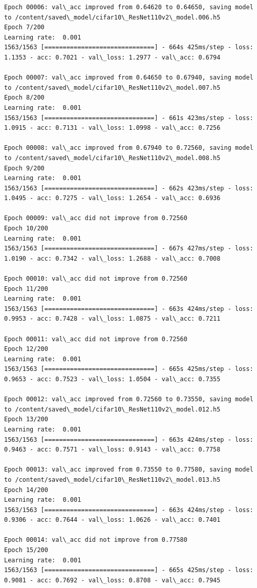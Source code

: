 \documentclass[11pt]{article}
\begin{document}
\begin{Verbatim}[commandchars=\\\{\}]
Epoch 00006: val\_acc improved from 0.64620 to 0.64650, saving model to /content/saved\_model/cifar10\_ResNet110v2\_model.006.h5
Epoch 7/200
Learning rate:  0.001
1563/1563 [==============================] - 664s 425ms/step - loss: 1.1353 - acc: 0.7021 - val\_loss: 1.2977 - val\_acc: 0.6794

Epoch 00007: val\_acc improved from 0.64650 to 0.67940, saving model to /content/saved\_model/cifar10\_ResNet110v2\_model.007.h5
Epoch 8/200
Learning rate:  0.001
1563/1563 [==============================] - 661s 423ms/step - loss: 1.0915 - acc: 0.7131 - val\_loss: 1.0998 - val\_acc: 0.7256

Epoch 00008: val\_acc improved from 0.67940 to 0.72560, saving model to /content/saved\_model/cifar10\_ResNet110v2\_model.008.h5
Epoch 9/200
Learning rate:  0.001
1563/1563 [==============================] - 662s 423ms/step - loss: 1.0495 - acc: 0.7275 - val\_loss: 1.2654 - val\_acc: 0.6936

Epoch 00009: val\_acc did not improve from 0.72560
Epoch 10/200
Learning rate:  0.001
1563/1563 [==============================] - 667s 427ms/step - loss: 1.0190 - acc: 0.7342 - val\_loss: 1.2688 - val\_acc: 0.7008

Epoch 00010: val\_acc did not improve from 0.72560
Epoch 11/200
Learning rate:  0.001
1563/1563 [==============================] - 663s 424ms/step - loss: 0.9953 - acc: 0.7428 - val\_loss: 1.0875 - val\_acc: 0.7211

Epoch 00011: val\_acc did not improve from 0.72560
Epoch 12/200
Learning rate:  0.001
1563/1563 [==============================] - 665s 425ms/step - loss: 0.9653 - acc: 0.7523 - val\_loss: 1.0504 - val\_acc: 0.7355

Epoch 00012: val\_acc improved from 0.72560 to 0.73550, saving model to /content/saved\_model/cifar10\_ResNet110v2\_model.012.h5
Epoch 13/200
Learning rate:  0.001
1563/1563 [==============================] - 663s 424ms/step - loss: 0.9463 - acc: 0.7571 - val\_loss: 0.9143 - val\_acc: 0.7758

Epoch 00013: val\_acc improved from 0.73550 to 0.77580, saving model to /content/saved\_model/cifar10\_ResNet110v2\_model.013.h5
Epoch 14/200
Learning rate:  0.001
1563/1563 [==============================] - 663s 424ms/step - loss: 0.9306 - acc: 0.7644 - val\_loss: 1.0626 - val\_acc: 0.7401

Epoch 00014: val\_acc did not improve from 0.77580
Epoch 15/200
Learning rate:  0.001
1563/1563 [==============================] - 665s 425ms/step - loss: 0.9081 - acc: 0.7692 - val\_loss: 0.8708 - val\_acc: 0.7945


\end{Verbatim}
\end{document}

